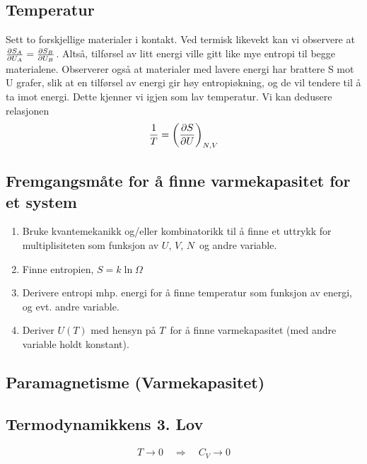 \documentclass[10pt,a4paper]{article}
\begin{document}
\begin{multicols}{2}
\subsection*{Temperatur}
\begin{framed}
Sett to forskjellige materialer i kontakt. Ved termisk likevekt kan vi observere at $\pdv{S_A}{U_A} = \pdv{S_B}{U_B}$. Altså, tilførsel av litt energi ville gitt like mye entropi til begge materialene. Observerer også at materialer med lavere energi har brattere S mot U grafer, slik at en tilførsel av energi gir høy entropiøkning, og de vil tendere til å ta imot energi. Dette kjenner vi igjen som lav temperatur. Vi kan dedusere relasjonen
\begin{align*}
	\frac{1}{T} = \qty(\pdv{S}{U})_{N,V}
\end{align*}
\end{framed}


\subsection*{Fremgangsmåte for å finne varmekapasitet for et system}
\begin{framed}
\begin{enumerate}
	\item Bruke kvantemekanikk og/eller kombinatorikk til å finne et uttrykk for multiplisiteten som funksjon av $U$, $V$, $N$ og andre variable.
	\item Finne entropien, $S=k\ln{\Omega}$
	\item Derivere entropi mhp. energi for å finne temperatur som funksjon av energi, og evt. andre variable.
	\item Deriver $U(T)$ med hensyn på $T$ for å finne varmekapasitet (med andre variable holdt konstant).
\end{enumerate}
\end{framed}


\subsection*{Paramagnetisme (Varmekapasitet)}


\subsection*{Termodynamikkens 3. Lov}
\begin{framed}
\begin{align*}
	T \rightarrow 0 \quad \Rightarrow \quad C_V \rightarrow 0 
\end{align*}
\end{framed}



\end{multicols}
\end{document}
